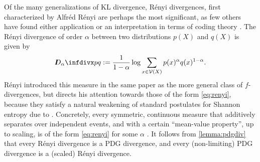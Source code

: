 \documentclass[twoside]{article}
\theoremstyle{plain}
\theoremstyle{definition}
\newcommand{\thickD}{I\mkern-8muD}
\newcommand{\V}{\mathcal V}
\begin{document}
Of the many generalizations of KL divergence, R\'enyi divergences, first characterized by Alfr\'ed R\'enyi \citeyear{renyi1961measures} are perhaps the most significant, as few others have found either application or an interpretation in terms of coding theory \parencite{van2014renyi}.
The R\'enyi divergence of order $\alpha$ between two distributions $p(X)$ and $q(X)$ is given by
\vspace{-1ex}
\begin{equation}
	\thickD_\alpha\infdivx p q := \frac{1}{1- \alpha} \log \sum_{x \in \V(X)} p(x)^\alpha q(x)^{1-\alpha}.  \label{eq:renyi}
\end{equation}
R\'enyi introduced this measure in the same paper as the more general
class of $f$-divergences, but directs his attention towards those of
the form \eqref{eq:renyi}, because they satisfy a natural weakening of
standard postulates for Shannon entropy due to
\textcite{fadeev1957begriff}.
Concretely, every symmetric, continuous measure that additively separates over independent events, and with a certain ``mean-value property'', up to scaling,
is of the form \eqref{eq:renyi} for some $\alpha$ \parencite{renyi1961measures}.
It follows from \cref{lemma:pdgdiv} that
every R\'enyi divergence is a PDG divergence, and
every (non-limiting) PDG divergence is a (scaled) R\'enyi divergence.
\end{document}
